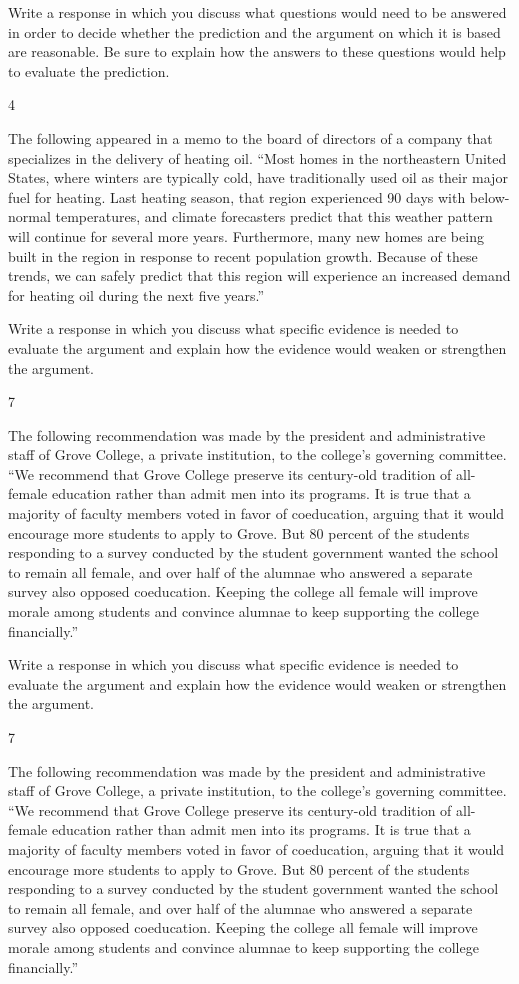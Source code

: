 \documentclass[]{article}
\begin{document}
Write a response in which you discuss what questions would need to be
answered in order to decide whether the prediction and the argument on
which it is based are reasonable. Be sure to explain how the answers to
these questions would help to evaluate the prediction.

4

The following appeared in a memo to the board of directors of a company
that specializes in the delivery of heating oil. ``Most homes in the
northeastern United States, where winters are typically cold, have
traditionally used oil as their major fuel for heating. Last heating
season, that region experienced 90 days with below-normal temperatures,
and climate forecasters predict that this weather pattern will continue
for several more years. Furthermore, many new homes are being built in
the region in response to recent population growth. Because of these
trends, we can safely predict that this region will experience an
increased demand for heating oil during the next five years.''

Write a response in which you discuss what specific evidence is needed
to evaluate the argument and explain how the evidence would weaken or
strengthen the argument.

7

The following recommendation was made by the president and
administrative staff of Grove College, a private institution, to the
college's governing committee. ``We recommend that Grove College
preserve its century-old tradition of all-female education rather than
admit men into its programs. It is true that a majority of faculty
members voted in favor of coeducation, arguing that it would encourage
more students to apply to Grove. But 80 percent of the students
responding to a survey conducted by the student government wanted the
school to remain all female, and over half of the alumnae who answered a
separate survey also opposed coeducation. Keeping the college all female
will improve morale among students and convince alumnae to keep
supporting the college financially.''

Write a response in which you discuss what specific evidence is needed
to evaluate the argument and explain how the evidence would weaken or
strengthen the argument.

7

The following recommendation was made by the president and
administrative staff of Grove College, a private institution, to the
college's governing committee. ``We recommend that Grove College
preserve its century-old tradition of all-female education rather than
admit men into its programs. It is true that a majority of faculty
members voted in favor of coeducation, arguing that it would encourage
more students to apply to Grove. But 80 percent of the students
responding to a survey conducted by the student government wanted the
school to remain all female, and over half of the alumnae who answered a
separate survey also opposed coeducation. Keeping the college all female
will improve morale among students and convince alumnae to keep
supporting the college financially.''
\end{document}
